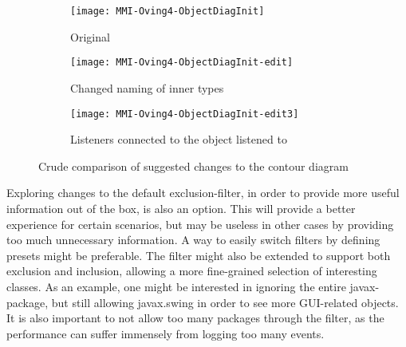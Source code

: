 \begin{figure}[H]
	\centering
	\begin{subfigure}{\textwidth}
		\centering
		\texttt{[image: MMI-Oving4-ObjectDiagInit]}
		\caption{Original}
		\label{fig:contOving4ChangesA}
	\end{subfigure}
	\begin{subfigure}{\textwidth}
		\centering
		\texttt{[image: MMI-Oving4-ObjectDiagInit-edit]}
		\caption{Changed naming of inner types}
		\label{fig:contOving4ChangesB}
	\end{subfigure}
	\begin{subfigure}{\textwidth}
		\centering
		\texttt{[image: MMI-Oving4-ObjectDiagInit-edit3]}
		\caption{Listeners connected to the object listened to}
		\label{fig:contOving4ChangesC}
	\end{subfigure}
	\caption{Crude comparison of suggested changes to the contour diagram}
	\label{fig:contOving4Changes} 
\end{figure}

Exploring changes to the default exclusion-filter, in order to provide more useful information out of the box, is also an option.
This will provide a better experience for certain scenarios, but may be useless in other cases by providing too much unnecessary information.
A way to easily switch filters by defining presets might be preferable.
The filter might also be extended to support both exclusion and inclusion, allowing a more fine-grained selection of interesting classes.
As an example, one might be interested in ignoring the entire javax-package, but still allowing javax.swing in order to see more GUI-related objects.
It is also important to not allow too many packages through the filter, as the performance can suffer immensely from logging too many events.
~\\

